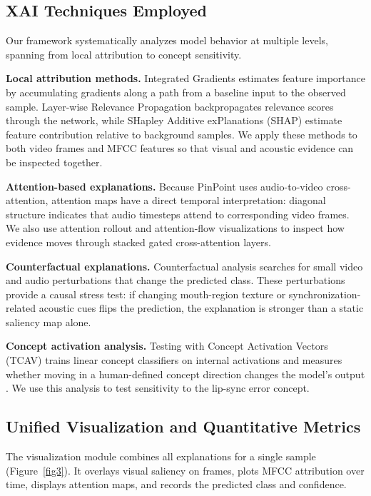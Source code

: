 \documentclass[pdflatex,sn-mathphys-num]{sn-jnl}
\begin{document}
\subsection{XAI Techniques Employed}\label{sec4.1}

Our framework systematically analyzes model behavior at multiple levels, spanning from local attribution to concept sensitivity.

\textbf{Local attribution methods.} Integrated Gradients estimates feature importance by accumulating gradients along a path from a baseline input to the observed sample. Layer-wise Relevance Propagation backpropagates relevance scores through the network, while SHapley Additive exPlanations (SHAP) estimate feature contribution relative to background samples. We apply these methods to both video frames and MFCC features so that visual and acoustic evidence can be inspected together.

\textbf{Attention-based explanations.} Because PinPoint uses audio-to-video cross-attention, attention maps have a direct temporal interpretation: diagonal structure indicates that audio timesteps attend to corresponding video frames. We also use attention rollout and attention-flow visualizations to inspect how evidence moves through stacked gated cross-attention layers.

\textbf{Counterfactual explanations.} Counterfactual analysis searches for small video and audio perturbations that change the predicted class. These perturbations provide a causal stress test: if changing mouth-region texture or synchronization-related acoustic cues flips the prediction, the explanation is stronger than a static saliency map alone.

\textbf{Concept activation analysis.} Testing with Concept Activation Vectors (TCAV) trains linear concept classifiers on internal activations and measures whether moving in a human-defined concept direction changes the model's output \cite{ref8}. We use this analysis to test sensitivity to the lip-sync error concept.

\subsection{Unified Visualization and Quantitative Metrics}\label{sec4.2}

The visualization module combines all explanations for a single sample (Figure~\ref{fig3}). It overlays visual saliency on frames, plots MFCC attribution over time, displays attention maps, and records the predicted class and confidence.
\end{document}
